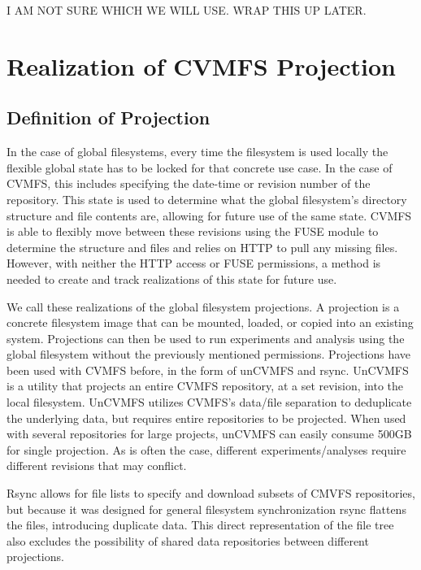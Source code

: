 \documentclass[sigconf]{acmart}
\begin{document}
I AM NOT SURE WHICH WE WILL USE. WRAP THIS UP LATER.
\fi

\section{Realization of CVMFS Projection}

\subsection{Definition of Projection}

In the case of global filesystems,
every time the filesystem is used locally
the flexible global state has to be 
locked for that concrete use case.
In the case of CVMFS,
this includes specifying the date-time
or revision number of the repository.
This state is used to determine 
what the global filesystem's directory
structure and file contents are, 
allowing for future use of the same state.
CVMFS is able to flexibly move
between these revisions using the FUSE module
to determine the structure and files and
relies on HTTP to pull any missing files.
However, with neither the HTTP access or
FUSE permissions, a method is needed to 
create and track realizations of this
state for future use.

We call these realizations of the global filesystem
projections.
A projection is a concrete filesystem image that can be
mounted, loaded, or copied into an existing system.
Projections can then be used to run experiments
and analysis using the global filesystem without
the previously mentioned permissions.
Projections have been used with CVMFS before,
in the form of unCVMFS and rsync.
UnCVMFS is a utility that projects an entire
CVMFS repository, at a set revision, into the local
filesystem. 
UnCVMFS utilizes CVMFS's data/file separation
to deduplicate the underlying data, but requires
entire repositories to be projected.
When used with several repositories for large projects,
unCVMFS can easily consume 500GB for single projection.
As is often the case, different experiments/analyses 
require different revisions that may conflict.

Rsync allows for file lists to specify and download
subsets of CMVFS repositories, but because it
was designed for general filesystem synchronization
rsync flattens the files, introducing duplicate data.
This direct representation of the file tree also
excludes the possibility of shared data repositories
between different projections.

\end{document}

